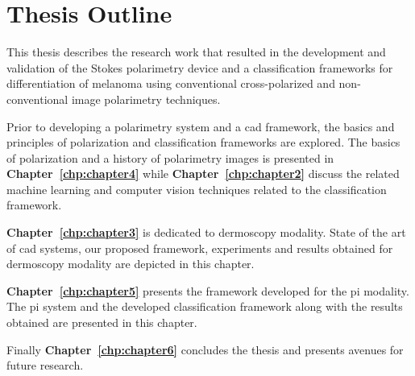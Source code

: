 \section{Thesis Outline}
\label{sec:chp1sec7}
This thesis describes the research work that resulted in the development and validation of the Stokes polarimetry device and a classification frameworks for differentiation of melanoma using conventional cross-polarized and non-conventional image polarimetry techniques. 

Prior to developing a polarimetry system and a \ac{cad} framework, the basics and principles of polarization and classification frameworks are explored.
The basics of polarization and a history of polarimetry images is presented in \textbf{Chapter~\ref{chp:chapter4}} while \textbf{Chapter~\ref{chp:chapter2}} discuss the related machine learning and computer vision techniques related to the classification framework.

\textbf{Chapter~\ref{chp:chapter3}} is dedicated to dermoscopy modality. 
State of the art of \ac{cad} systems, our proposed framework, experiments and results obtained for dermoscopy modality are depicted in this chapter. 

\textbf{Chapter~\ref{chp:chapter5}} presents the framework developed for the \ac{pi} modality. 
The \Ac{pi} system and the developed classification framework along with the results obtained are presented in this chapter. 

Finally \textbf{Chapter~\ref{chp:chapter6}} concludes the thesis and presents avenues for future research.

	
